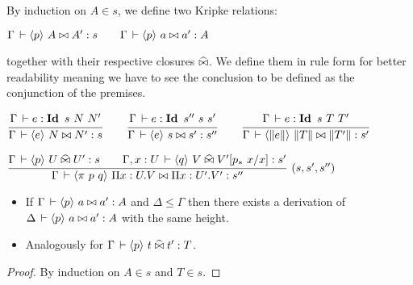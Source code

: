 \documentclass[a4paper,english]{lipics-utf8x}
\begin{document}

  By induction on $A \in s$, we define two Kripke relations:
  \begin{center}
  \(
    \Gamma \,\vdash \langle p \rangle~ A \mathrel{\bowtie} A' : s
    \qquad
    \Gamma \,\vdash \langle p \rangle~ a \mathrel{\bowtie} a' : A
  \)
  \end{center}
  together with their respective closures $\mathrel{\widehat{\bowtie}}$.
  We define them in rule form for better readability meaning we have to see the
  conclusion to be defined as the conjunction of the premises.

  \begin{mathc}
    \qquad
  \end{mathc}

  \begin{center}
  \(
    \ru{\Gamma \der e : \Id s\ N\ N'
      }{\Gamma \der \hideq{e} N \Er N' : s}
    \qquad
    \ru{\Gamma \der e : \Id s''\ s\ s'
      }{\Gamma \der \hideq{e} s \Er s' : s''}
    \qquad
    \ru{\Gamma \der e : \Id s\ T\ T'
      }{\Gamma \der \hideq{\squash{e}} \squash{T} \Er \squash{T'} : s'}
  \)
  \end{center}

  \begin{center}
  \(
    \rux{\Gamma \der \hideq{p} U \hEr U' : s \qquad
          \Gamma, x:U \der \hideq{q} V \hEr V'[p_*\ x / x] : s'
        }{\Gamma \der \hideq{\pi\ p\ q} \Pi x:U.V \Er \Pi x:U'.V' : s''
        }{(s,s',s'')}
  \)
  \end{center}

  \begin{mathc}
  \end{mathc}

  \begin{lemma}[Weakening]
    \leavevmode
    \begin{itemize}
      \item If $\Gamma \,\vdash \langle p \rangle~ a \mathrel{\bowtie} a' : A$ and $\Delta \le \Gamma$ then
      there exists a derivation of $\Delta \,\vdash \langle p \rangle~ a \mathrel{\bowtie} a' : A$ with the
      same height.
      \item Analogously for $\Gamma \,\vdash \langle p \rangle~ t \mathrel{\widehat{\bowtie}} t' : T$.
    \end{itemize}
  \end{lemma}
  \begin{proof}
    By induction on $A \in s$ and $T \in s$.
  \end{proof}
\end{document}
